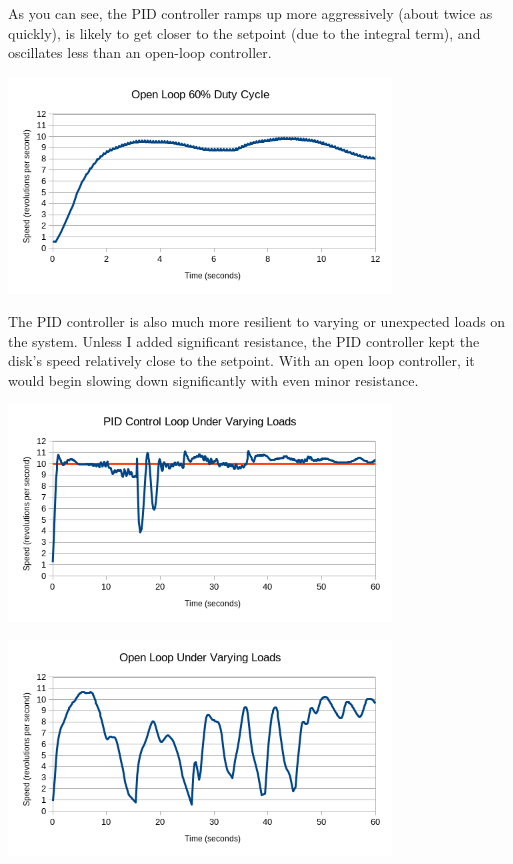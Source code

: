 \documentclass{article}
\begin{document}
As you can see, the PID controller ramps up more aggressively (about twice as quickly), is likely to get closer to the setpoint (due to the integral term), and oscillates less than an open-loop controller.
\begin{center}
  \includegraphics[width=4in]{open_step.png}
\end{center}
The PID controller is also much more resilient to varying or unexpected loads on the system. Unless I added significant resistance, the PID controller kept the disk's speed relatively close to the setpoint. With an open loop controller, it would begin slowing down significantly with even minor resistance.
\begin{center}
  \includegraphics[width=4in]{closed_load.png}
\end{center}
\begin{center}
  \includegraphics[width=4in]{open_load.png}
\end{center}
\end{document}
